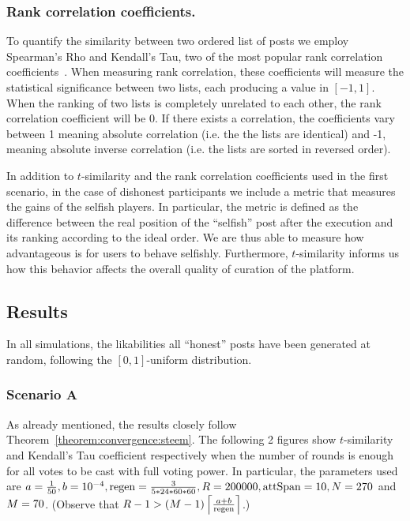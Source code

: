     \subsubsection*{Rank correlation coefficients.}
      To quantify the similarity between two ordered list of posts we employ
      Spearman's Rho and Kendall's Tau, two of the most popular rank correlation
      coefficients~\cite{kendall1955rank}. When measuring rank correlation,
      these coefficients will measure the statistical significance between two
      lists, each producing a value in $\left[-1, 1\right]$. When the ranking of
      two lists is completely unrelated to each other, the rank correlation
      coefficient will be 0. If there exists a correlation, the coefficients
      vary between 1 meaning absolute correlation (i.e. the the lists are
      identical) and -1, meaning absolute inverse correlation (i.e. the lists
      are sorted in reversed order).

    In addition to $t$-similarity and the rank correlation coefficients used in
    the first scenario, in the case of dishonest participants we include a
    metric that measures the gains of the selfish players. In particular, the
    metric is defined as the difference between the real position of the
    ``selfish'' post after the execution and its ranking according to the ideal
    order. We are thus able to measure how advantageous is for users to behave
    selfishly.  Furthermore, $t$-similarity informs us how this behavior
    affects the overall quality of curation of the platform.

  \subsection{Results}
    In all simulations, the likabilities all ``honest'' posts have been
    generated at random, following the $\left[0, 1\right]$-uniform distribution.

    \subsubsection*{Scenario A}
      As already mentioned, the results closely follow
      Theorem~\ref{theorem:convergence:steem}. The following 2 figures show
      $t$-similarity and Kendall's Tau coefficient respectively when the number
      of rounds is enough for all votes to be cast with full voting power. In
      particular, the parameters used are $a = \frac{1}{50}, b = 10^{-4}, \regen
      = \frac{3}{5*24*60*60}, \rounds = 200000, \attspan = 10, \playerlen = 270$
      and $\postlen = 70$. (Observe that $\rounds - 1 > \left(\postlen -
      1\right)\ceil*{\frac{a + b}{\regen}}$.)

